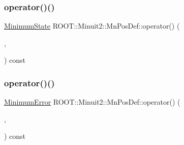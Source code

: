 \mbox{\label{classROOT_1_1Minuit2_1_1MnPosDef_a5a550c841e9b62d3c09cdf9df61a88f4}} 
\subsubsection{\texorpdfstring{operator()()}{operator()()}\hspace{0.1cm}{\footnotesize\ttfamily [3/6]}}
{\footnotesize\ttfamily \mbox{\hyperlink{classROOT_1_1Minuit2_1_1MinimumState}{Minimum\+State}} R\+O\+O\+T\+::\+Minuit2\+::\+Mn\+Pos\+Def\+::operator() (\begin{DoxyParamCaption}\item[{const \mbox{\hyperlink{classROOT_1_1Minuit2_1_1MinimumState}{Minimum\+State}} \&}]{,  }\item[{const \mbox{\hyperlink{classROOT_1_1Minuit2_1_1MnMachinePrecision}{Mn\+Machine\+Precision}} \&}]{ }\end{DoxyParamCaption}) const}

\mbox{\label{classROOT_1_1Minuit2_1_1MnPosDef_ace62b61f17edf0c57ef824003b99b9ec}} 
\subsubsection{\texorpdfstring{operator()()}{operator()()}\hspace{0.1cm}{\footnotesize\ttfamily [4/6]}}
{\footnotesize\ttfamily \mbox{\hyperlink{classROOT_1_1Minuit2_1_1MinimumError}{Minimum\+Error}} R\+O\+O\+T\+::\+Minuit2\+::\+Mn\+Pos\+Def\+::operator() (\begin{DoxyParamCaption}\item[{const \mbox{\hyperlink{classROOT_1_1Minuit2_1_1MinimumError}{Minimum\+Error}} \&}]{,  }\item[{const \mbox{\hyperlink{classROOT_1_1Minuit2_1_1MnMachinePrecision}{Mn\+Machine\+Precision}} \&}]{ }\end{DoxyParamCaption}) const}

\mbox{\label{classROOT_1_1Minuit2_1_1MnPosDef_ace62b61f17edf0c57ef824003b99b9ec}} 
